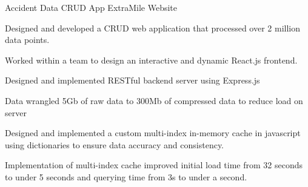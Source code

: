 \begin{cventries}
    \cventry
    {Accident Data CRUD App} %
    {ExtraMile Website} %
    {\href{https://github.com/giathuan123/extramile}{\faGithubSquare}} %
    {\diExpressOriginal \diReactPlainWordmark \diNodejsPlain \diPythonPlain } %
    {
        \begin{cvitems} %
            \item Designed and developed a CRUD web application that processed over 2 million
            data points.
            \item Worked within a team to design an interactive and dynamic React.js frontend.
            \item Designed and implemented RESTful backend server using Express.js
            \item Data wrangled 5Gb of raw data to 300Mb of compressed data to reduce load on
            server
            \item Designed and implemented a custom multi-index in-memory cache in javascript
            using dictionaries to ensure data accuracy and consistency.
            \item Implementation of multi-index cache improved initial load time from 32 seconds
            to under 5 seconds and querying time from 3s to under a second.
        \end{cvitems}
    }


\end{cventries}
